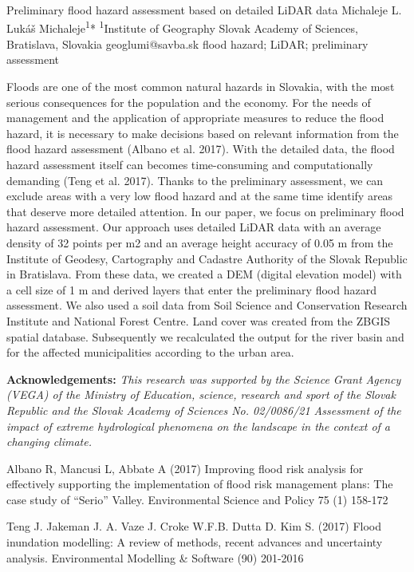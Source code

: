 \abstract
{Preliminary flood hazard assessment based on detailed LiDAR data} 
{Michaleje L.} 
{Lukáš Michaleje\textsuperscript{1}*} 
{\TLtag} 
{
\textsuperscript{1}Institute of Geography Slovak Academy of Sciences, Bratislava, Slovakia
}
{geoglumi@savba.sk}  %
{flood hazard; LiDAR; preliminary assessment}
{
Floods are one of the most common natural hazards in Slovakia, with the most serious consequences for the population and the economy. For the needs of management and the application of appropriate measures to reduce the flood hazard, it is necessary to make decisions based on relevant information from the flood hazard assessment (Albano et al. 2017). With the detailed data, the flood hazard assessment itself can becomes time-consuming and computationally demanding (Teng et al. 2017). Thanks to the preliminary assessment, we can exclude areas with a very low flood hazard and at the same time identify areas that deserve more detailed attention.
In our paper, we focus on preliminary flood hazard assessment. Our approach uses detailed LiDAR data with an average density of 32 points per m2 and an average height accuracy of 0.05 m from the Institute of Geodesy, Cartography and Cadastre Authority of the Slovak Republic in Bratislava. From these data, we created a DEM (digital elevation model) with a cell size of 1 m and derived layers that enter the preliminary flood hazard assessment. We also used a soil data from Soil Science and Conservation Research Institute and National Forest Centre. Land cover was created from the ZBGIS spatial database. Subsequently we recalculated the output for the river basin and for the affected municipalities according to the urban area.

\vspace{0.5em}
\noindent
\textbf{Acknowledgements:}
\textit{This research was supported by the Science Grant Agency (VEGA) of the Ministry of Education, science, research and sport of the Slovak Republic and the Slovak Academy of Sciences No. 02/0086/21 Assessment of the impact of extreme hydrological phenomena on the landscape in the context of a changing climate.}
}
{Albano R, Mancusi L, Abbate A (2017) Improving flood risk analysis for effectively supporting the implementation of flood risk management plans: The case study of “Serio” Valley. Environmental Science and Policy 75 (1) 158-172 

Teng J. Jakeman J. A. Vaze J. Croke W.F.B. Dutta D. Kim S. (2017) Flood inundation modelling: A review of methods, recent advances and uncertainty analysis. Environmental Modelling \& Software (90) 201-2016 	
}

